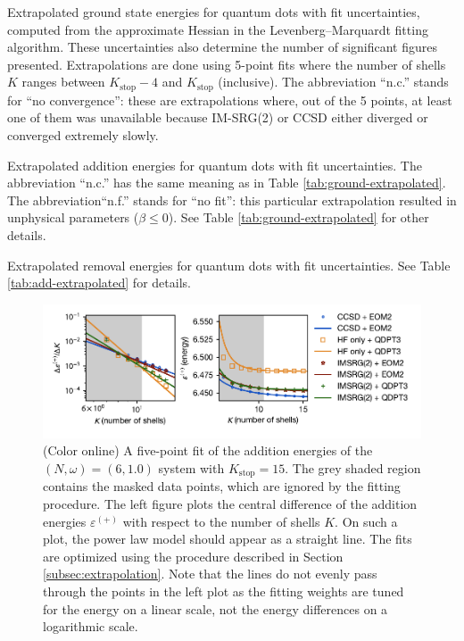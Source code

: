 \begin{table}
  \centering
  \caption{Extrapolated ground state energies for quantum dots with fit uncertainties, computed from the approximate Hessian in the Levenberg--Marquardt fitting algorithm.  These uncertainties also determine the number of significant figures presented.  Extrapolations are done using 5-point fits where the number of shells $K$ ranges between $K_{\text{stop}} - 4$ and $K_{\text{stop}}$ (inclusive).  The abbreviation ``n.c.'' stands for ``no convergence'': these are extrapolations where, out of the 5 points, at least one of them was unavailable because IM-SRG(2) or CCSD either diverged or converged extremely slowly.}
  \label{tab:ground-extrapolated}
  
\end{table}

\begin{table}
  \centering
  \caption{Extrapolated addition energies for quantum dots with fit uncertainties.  The abbreviation ``n.c.'' has the same meaning as in Table \ref{tab:ground-extrapolated}.  The abbreviation``n.f.'' stands for ``no fit'': this particular extrapolation resulted in unphysical parameters ($\beta \le 0$).  See Table \ref{tab:ground-extrapolated} for other details.}
  \label{tab:add-extrapolated}
  
\end{table}

\begin{table}
  \centering
  \caption{Extrapolated removal energies for quantum dots with fit uncertainties.  See Table \ref{tab:add-extrapolated} for details.}
  \label{tab:rm-extrapolated}
  
\end{table}

\begin{figure}
  \centering
  \includegraphics{fig-fit-2-1p0-add.pdf}
  \caption{(Color online) A five-point fit of the addition energies of the $(N, \omega) = (6, 1.0)$ system with $K_{\text{stop}} = 15$.  The grey shaded region contains the masked data points, which are ignored by the fitting procedure.  The left figure plots the central difference of the addition energies $\varepsilon^{(+)}$ with respect to the number of shells $K$.  On such a plot, the power law model should appear as a straight line.  The fits are optimized using the procedure described in Section \ref{subsec:extrapolation}.  Note that the lines do not evenly pass through the points in the left plot as the fitting weights are tuned for the energy on a linear scale, not the energy differences on a logarithmic scale.}
  \label{fig:by-fit-2-1p0-add}
\end{figure}

